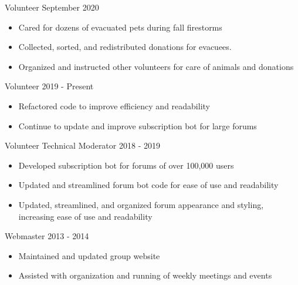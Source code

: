 \documentclass[11pt]{article} %
\begin{document}
\begin{description}
\squish

           {Volunteer}
           {September 2020}

\begin{itemize}
  \item Cared for dozens of evacuated pets during fall firestorms
  \item Collected, sorted, and redistributed donations for evacuees.
  \item Organized and instructed other volunteers for care of animals and
    donations
\end{itemize}


            {Volunteer}
            {2019 - Present}

\begin{itemize}
  \item Refactored code to improve efficiency and readability
  \item Continue to update and improve subscription bot for large forums
\end{itemize}


            {Volunteer Technical Moderator}
            {2018 - 2019}

\begin{itemize}
  \item Developed subscription bot for forums of over 100,000 users
  \item Updated and streamlined forum bot code for ease of use and readability
  \item Updated, streamlined, and organized forum appearance and styling,
    increasing ease of use and readability
\end{itemize}


           {Webmaster}
           {2013 - 2014}

\begin{itemize}
  \item Maintained and updated group website
  \item Assisted with organization and running of weekly meetings and events
\end{itemize}

\end{description}


\end{document}
